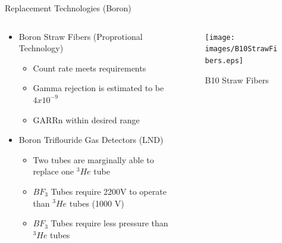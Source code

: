 \begin{frame}{Replacement Technologies (Boron)}
\begin{columns}[onlytextwidth]
\begin{column}{0.45\textwidth}
\begin{itemize}
	\small
	\item Boron Straw Fibers (Proprotional Technology) \cite{kouzes_boron-lined_2012}
	\begin{itemize}
		\tiny
		\item Count rate meets requirements
		\item Gamma rejection is estimated to be $4x10^{-9}$
		\item GARRn within desired range
	\end{itemize}
	\small
	\item Boron Triflouride Gas Detectors (LND) \cite{kouzes_bf3_2009}
	\begin{itemize}
		\tiny
		\item Two tubes are marginally able to replace one ${}^3He$ tube
		\item $BF_3$ Tubes require 2200V to operate than ${}^3He$ tubes (1000 V)
		\item $BF_3$ Tubes require less pressure than ${}^3He$ tubes
	\end{itemize}
\end{itemize}
\end{column}
\begin{column}{0.45\textwidth}
	\begin{figure}
	\centering
		\texttt{[image: images/B10StrawFibers.eps]}
		\caption{B10 Straw Fibers}
		\label{fig:B10StrawFibers}

\end{figure}
\end{column}
\end{columns}
\end{frame}
